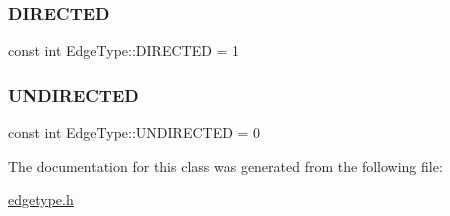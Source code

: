 \subsubsection{\texorpdfstring{D\+I\+R\+E\+C\+T\+ED}{DIRECTED}}
{\footnotesize\ttfamily const int Edge\+Type\+::\+D\+I\+R\+E\+C\+T\+ED = 1\hspace{0.3cm}{\ttfamily [static]}}

\hypertarget{class_edge_type_a6533cc56d05c288a550b9980b66c9317}{}\label{class_edge_type_a6533cc56d05c288a550b9980b66c9317} 
\subsubsection{\texorpdfstring{U\+N\+D\+I\+R\+E\+C\+T\+ED}{UNDIRECTED}}
{\footnotesize\ttfamily const int Edge\+Type\+::\+U\+N\+D\+I\+R\+E\+C\+T\+ED = 0\hspace{0.3cm}{\ttfamily [static]}}



The documentation for this class was generated from the following file\+:\begin{DoxyCompactItemize}
\item 
\hyperlink{edgetype_8h}{edgetype.\+h}\end{DoxyCompactItemize}
